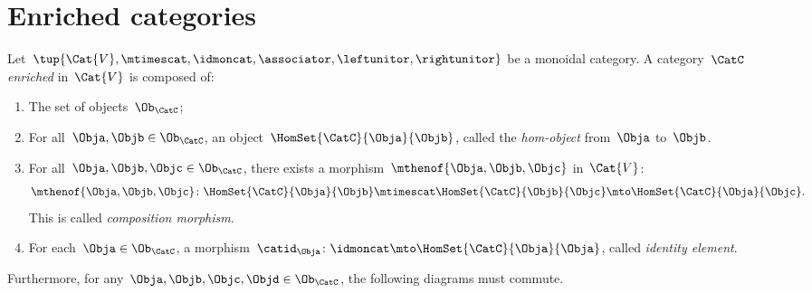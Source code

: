 
\section{Enriched categories}
\label{sec:enrichment-enriched-categories}

\begin{ctdefinition}
	\label{def:enriched_cat}
	Let~$\tup{\Cat{V},\mtimescat, \idmoncat, \associator, \leftunitor,\rightunitor}$ be a monoidal category.
	A category~$\CatC$ \emph{enriched} in~$\Cat{V}$ is composed of:
	\begin{enumerate}
		\item The set of objects~$\Ob_\CatC$;
		\item For all~$\Obja,\Objb\in \Ob_\CatC$, an object~$\HomSet{\CatC}{\Obja}{\Objb}$, called the \emph{hom-object} from~$\Obja$ to~$\Objb$.
		\item For all~$\Obja, \Objb, \Objc\in \Ob_\CatC$, there exists a morphism~$\mthenof{\Obja,\Objb,\Objc}$ in~$\Cat{V}$:
		      \begin{equation}
			      \mthenof{\Obja,\Objb,\Objc}\colon \HomSet{\CatC}{\Obja}{\Objb}\mtimescat \HomSet{\CatC}{\Objb}{\Objc}\mto \HomSet{\CatC}{\Obja}{\Objc}.
		      \end{equation}
		      This is called \emph{composition morphism}.
		\item For each~$\Obja\in \Ob_\CatC$, a morphism~$\catid_\Obja\colon \idmoncat \mto \HomSet{\CatC}{\Obja}{\Obja}$, called \emph{identity element}.
	\end{enumerate}
	Furthermore, for any~$\Obja,\Objb,\Objc,\Objd\in \Ob_\CatC$, the following diagrams must commute.
\end{ctdefinition}

\begin{widepar}
	\begin{center}
	\end{center}

	\begin{center}
	\end{center}
\end{widepar}


